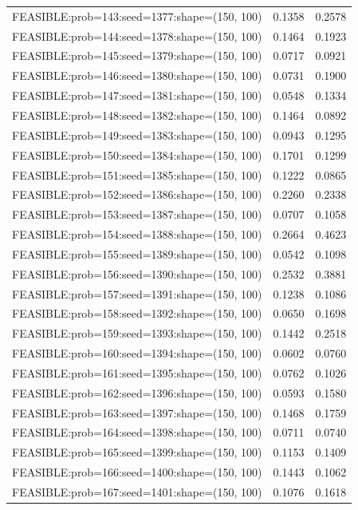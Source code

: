 \begin{longtable}{lcc}
FEASIBLE:prob=143:seed=1377:shape=(150, 100) &   0.1358 & 0.2578 \\
FEASIBLE:prob=144:seed=1378:shape=(150, 100) &   0.1464 & 0.1923 \\
FEASIBLE:prob=145:seed=1379:shape=(150, 100) &   0.0717 & 0.0921 \\
FEASIBLE:prob=146:seed=1380:shape=(150, 100) &   0.0731 & 0.1900 \\
FEASIBLE:prob=147:seed=1381:shape=(150, 100) &   0.0548 & 0.1334 \\
FEASIBLE:prob=148:seed=1382:shape=(150, 100) &   0.1464 & 0.0892 \\
FEASIBLE:prob=149:seed=1383:shape=(150, 100) &   0.0943 & 0.1295 \\
FEASIBLE:prob=150:seed=1384:shape=(150, 100) &   0.1701 & 0.1299 \\
FEASIBLE:prob=151:seed=1385:shape=(150, 100) &   0.1222 & 0.0865 \\
FEASIBLE:prob=152:seed=1386:shape=(150, 100) &   0.2260 & 0.2338 \\
FEASIBLE:prob=153:seed=1387:shape=(150, 100) &   0.0707 & 0.1058 \\
FEASIBLE:prob=154:seed=1388:shape=(150, 100) &   0.2664 & 0.4623 \\
FEASIBLE:prob=155:seed=1389:shape=(150, 100) &   0.0542 & 0.1098 \\
FEASIBLE:prob=156:seed=1390:shape=(150, 100) &   0.2532 & 0.3881 \\
FEASIBLE:prob=157:seed=1391:shape=(150, 100) &   0.1238 & 0.1086 \\
FEASIBLE:prob=158:seed=1392:shape=(150, 100) &   0.0650 & 0.1698 \\
FEASIBLE:prob=159:seed=1393:shape=(150, 100) &   0.1442 & 0.2518 \\
FEASIBLE:prob=160:seed=1394:shape=(150, 100) &   0.0602 & 0.0760 \\
FEASIBLE:prob=161:seed=1395:shape=(150, 100) &   0.0762 & 0.1026 \\
FEASIBLE:prob=162:seed=1396:shape=(150, 100) &   0.0593 & 0.1580 \\
FEASIBLE:prob=163:seed=1397:shape=(150, 100) &   0.1468 & 0.1759 \\
FEASIBLE:prob=164:seed=1398:shape=(150, 100) &   0.0711 & 0.0740 \\
FEASIBLE:prob=165:seed=1399:shape=(150, 100) &   0.1153 & 0.1409 \\
FEASIBLE:prob=166:seed=1400:shape=(150, 100) &   0.1443 & 0.1062 \\
FEASIBLE:prob=167:seed=1401:shape=(150, 100) &   0.1076 & 0.1618 \\

\end{longtable}
